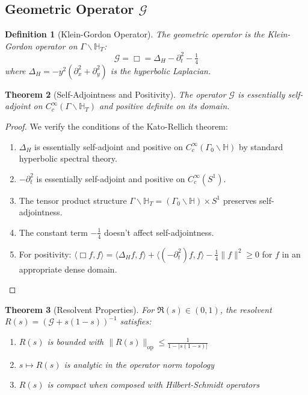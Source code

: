 \documentclass[11pt]{article}
\theoremstyle{plain}
\newtheorem{theorem}{Theorem}[section]
\newtheorem{definition}[theorem]{Definition}
\theoremstyle{remark}
\newcommand{\H}{\mathbb{H}}
\newcommand{\cG}{\mathcal{G}}
\newcommand{\BoxOp}{\Box}
\newcommand{\Laplace}{\Delta}
\begin{document}
\subsection{Geometric Operator $\cG$}

\begin{definition}[Klein-Gordon Operator]
The geometric operator is the Klein-Gordon operator on $\Gamma \backslash \H_T$:
\[
\cG = \BoxOp = \Laplace_H - \partial_t^2 - \tfrac{1}{4}
\]
where $\Laplace_H = -y^2(\partial_x^2 + \partial_y^2)$ is the hyperbolic Laplacian.
\end{definition}

\begin{theorem}[Self-Adjointness and Positivity]
The operator $\cG$ is essentially self-adjoint on $C_c^\infty(\Gamma \backslash \H_T)$ and positive definite on its domain.
\end{theorem}

\begin{proof}
We verify the conditions of the Kato-Rellich theorem:

\begin{enumerate}
\item $\Laplace_H$ is essentially self-adjoint and positive on $C_c^\infty(\Gamma_0 \backslash \H)$ by standard hyperbolic spectral theory.

\item $-\partial_t^2$ is essentially self-adjoint and positive on $C_c^\infty(S^1)$.

\item The tensor product structure $\Gamma \backslash \H_T = (\Gamma_0 \backslash \H) \times S^1$ preserves self-adjointness.

\item The constant term $-\tfrac{1}{4}$ doesn't affect self-adjointness.

\item For positivity: $\langle \BoxOp f, f \rangle = \langle \Laplace_H f, f \rangle + \langle (-\partial_t^2) f, f \rangle - \tfrac{1}{4}\|f\|^2 \geq 0$ for $f$ in an appropriate dense domain.
\end{enumerate}
\end{proof}

\begin{theorem}[Resolvent Properties]
For $\Re(s) \in (0,1)$, the resolvent $R(s) = (\cG + s(1-s))^{-1}$ satisfies:
\begin{enumerate}
\item $R(s)$ is bounded with $\|R(s)\|_{\text{op}} \leq \frac{1}{1 - |s(1-s)|}$
\item $s \mapsto R(s)$ is analytic in the operator norm topology
\item $R(s)$ is compact when composed with Hilbert-Schmidt operators
\end{enumerate}
\end{theorem}
\end{document}
